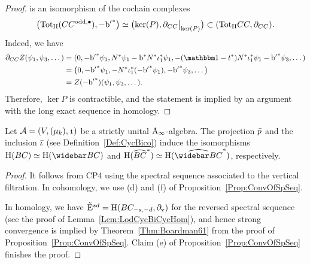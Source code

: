 \documentclass[\MainFolder/Text.tex]{subfiles}
\begin{document}
\begin{proof}
is an isomorphism of the cochain complexes
\[ \bigl(\TotII(\LodCycBi^{\mathrm{odd},\bullet}),-{\Hd'}^*\bigr) \simeq \bigl(\ker(P),\Restr{\Bdd_{\LodCycBi}}{\ker(P)}\bigr) \subset (\TotII\LodCycBi,\Bdd_{\LodCycBi}). \]
Indeed, we have 
\begin{align*}
 \Bdd_{\LodCycBi}Z(\psi_1,\psi_3,\dotsc) &= (0,-{\Hd'}^*\psi_1, \CountOp^*\psi_1 - \Hd^*\CountOp^*\InsOneOp_1^*\psi_1, -(\Id-\CycPermOp^*)\CountOp^*\InsOneOp_1^*\psi_1 - {\Hd'}^*\psi_3, \dotsc ) \\
  &= \bigl(0,-{\Hd'}^*\psi_1,-\CountOp^*\InsOneOp_1^*(-{\Hd'}^*\psi_1), -{\Hd'}^*\psi_3,\dotsc\bigr) \\
  & = Z(-{\Hd'}^*)(\psi_1,\psi_3,\dotsc).
\end{align*}
Therefore, $\ker P$ is contractible, and the statement is implied by an argument with the long exact sequence in homology.
\end{proof}


\begin{Lemma}\label{Lem:ConNormVer}
Let $\Alg=(V,(\mu_k),\NOne)$ be a strictly unital $\mathrm{A}_\infty$-algebra. The projection $\bar{p}$ and the inclusion $\bar{\iota}$ (see Definition~\ref{Def:CycBico}) induce the isomorphisms $\H(\ConCycBi) \simeq \H(\NConCycBi)$ and $\H(\widehat{\ConCycBi}^*)\simeq\H(\widehat{\NConCycBi}^*)$, respectively.
\end{Lemma}
\begin{proof}
It follows from CP4 using the spectral sequence associated to the vertical filtration. In cohomology, we use (d) and (f) of Proposition~\ref{Prop:ConvOfSpSeq}.

In homology, we have $\tilde{\mathrm{E}}^{sd} = \mathrm{H}(BC_{-s,-d},\partial_{\mathrm{v}})$ for the reversed spectral sequence (see the proof of Lemma~\ref{Lem:LodCycBiCycHom}), and hence strong convergence is implied by Theorem~\ref{Thm:Boardman61} from the proof of Proposition~\ref{Prop:ConvOfSpSeq}. Claim (e) of Proposition~\ref{Prop:ConvOfSpSeq} finishes the proof.
\end{proof}
\end{document}
